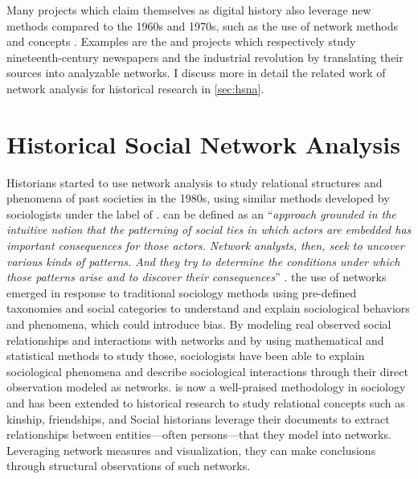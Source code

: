 Many projects which claim themselves as digital history also leverage new methods compared to the 1960s and 1970s, such as the use of network methods and concepts \cite{ahnertNetworkTurnChanging2020}.
Examples are the \cite{cordell2017viral} and \cite{ardanuyLivingMachinesStudy2020} projects which respectively study nineteenth-century newspapers and the industrial revolution by translating their sources into analyzable networks.
I discuss more in detail the related work of network analysis for historical research in \autoref{sec:hsna}.


\section{Historical Social Network Analysis}\label{sec:hsna}

Historians started to use network analysis to study relational structures and phenomena of past societies in the 1980s, using similar methods developed by sociologists under the label of \sna.
\sna can be defined as an ``\textit{approach grounded in the intuitive notion that the patterning of social ties in which actors are embedded has important consequences for those actors. Network analysts, then, seek to uncover various kinds of patterns. And they try to determine the conditions under which those patterns arise and to discover their consequences}'' \cite{freemanDevelopmentSocialNetwork2004}.
the use of networks emerged in response to traditional sociology methods using pre-defined taxonomies and social categories to understand and explain sociological behaviors and phenomena, which could introduce bias\cite{scottSocialNetworkAnalysis1988}.
By modeling real observed social relationships and interactions with networks and by using mathematical and statistical methods to study those, sociologists have been able to explain sociological phenomena and describe sociological interactions through their direct observation modeled as networks.
\sna is now a well-praised methodology in sociology and has been extended to historical research to study relational concepts such as kinship, friendships, and 
Social historians leverage their documents to extract relationships between entities---often persons---that they model into networks.
Leveraging network measures and visualization, they can make conclusions through structural observations of such networks.


